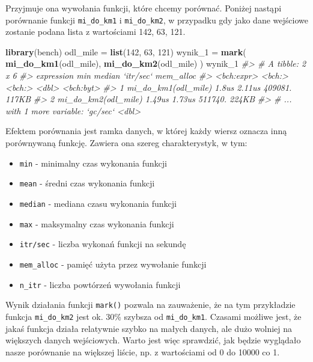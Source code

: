 \documentclass[paper=6in:9in,pagesize=pdftex,headinclude=on,footinclude=on,10pt]{scrbook}
\newenvironment{Shaded}{\begin{snugshade}}{\end{snugshade}}
\newcommand{\CommentTok}[1]{\textcolor[rgb]{0.56,0.35,0.01}{\textit{#1}}}
\newcommand{\DecValTok}[1]{\textcolor[rgb]{0.00,0.00,0.81}{#1}}
\newcommand{\KeywordTok}[1]{\textcolor[rgb]{0.13,0.29,0.53}{\textbf{#1}}}
\newcommand{\NormalTok}[1]{#1}
\newcommand{\StringTok}[1]{\textcolor[rgb]{0.31,0.60,0.02}{#1}}
\providecommand{\tightlist}{%
  \setlength{\itemsep}{0pt}\setlength{\parskip}{0pt}}
\begin{document}
Przyjmuje ona wywołania funkcji, które chcemy porównać.
Poniżej nastąpi porównanie funkcji \texttt{mi\_do\_km1} i \texttt{mi\_do\_km2}, w przypadku gdy jako dane wejściowe zostanie podana lista z wartościami 142, 63, 121.

\begin{Shaded}
\begin{Highlighting}[]
\KeywordTok{library}\NormalTok{(bench)}
\NormalTok{odl_mile =}\StringTok{ }\KeywordTok{list}\NormalTok{(}\DecValTok{142}\NormalTok{, }\DecValTok{63}\NormalTok{, }\DecValTok{121}\NormalTok{)}
\NormalTok{wynik_}\DecValTok{1}\NormalTok{ =}\StringTok{ }\KeywordTok{mark}\NormalTok{(}
  \KeywordTok{mi_do_km1}\NormalTok{(odl_mile),}
  \KeywordTok{mi_do_km2}\NormalTok{(odl_mile)}
\NormalTok{)}
\NormalTok{wynik_}\DecValTok{1}
\CommentTok{#> # A tibble: 2 x 6}
\CommentTok{#>   expression             min median `itr/sec` mem_alloc}
\CommentTok{#>   <bch:expr>          <bch:> <bch:>     <dbl> <bch:byt>}
\CommentTok{#> 1 mi_do_km1(odl_mile)  1.8us 2.11us   409081.     117KB}
\CommentTok{#> 2 mi_do_km2(odl_mile) 1.49us 1.73us   511740.     224KB}
\CommentTok{#> # ... with 1 more variable: `gc/sec` <dbl>}
\end{Highlighting}
\end{Shaded}

Efektem porównania jest ramka danych, w której każdy wiersz oznacza inną porównywaną funkcję.
Zawiera ona szereg charakterystyk, w tym:

\begin{itemize}
\tightlist
\item
  \texttt{min} - minimalny czas wykonania funkcji
\item
  \texttt{mean} - średni czas wykonania funkcji
\item
  \texttt{median} - mediana czasu wykonania funkcji
\item
  \texttt{max} - maksymalny czas wykonania funkcji
\item
  \texttt{itr/sec} - liczba wykonań funkcji na sekundę
\item
  \texttt{mem\_alloc} - pamięć użyta przez wywołanie funkcji
\item
  \texttt{n\_itr} - liczba powtórzeń wywołania funkcji
\end{itemize}

Wynik działania funkcji \texttt{mark()} pozwala na zauważenie, że na tym przykładzie funkcja \texttt{mi\_do\_km2} jest ok. 30\% szybsza od \texttt{mi\_do\_km1}.
Czasami możliwe jest, że jakaś funkcja działa relatywnie szybko na małych danych, ale dużo wolniej na większych danych wejściowych.
Warto jest więc sprawdzić, jak będzie wyglądało nasze porównanie na większej liście, np. z wartościami od 0 do 10000 co 1.
\end{document}
